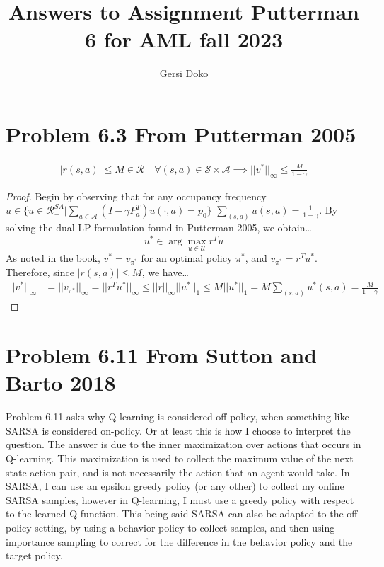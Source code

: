 \documentclass[11pt]{article}
\title{Answers to Assignment Putterman 6 for AML fall 2023}
\author{Gersi Doko}
\begin{document}
\maketitle

\section{Problem 6.3 From Putterman 2005}
\begin{align*}
	|r(s,a)| \leq M \in \mathcal{R} \quad \forall (s,a) \in \mathcal{S} \times \mathcal{A} \implies
	\lvert\lvert v^* \rvert\rvert_\infty \leq \frac{M}{1-\gamma}
\end{align*}

\begin{proof}
	Begin by observing that for any occupancy frequency
	$u \in \{u \in \mathcal{R}^{SA}_+ \vert \sum_{a\in\mathcal{A}}(I - \gamma P^T_a)u(\cdot, a) = p_0\}$
	$\sum_{(s,a)} u(s,a) = \frac{1}{1-\gamma}$. By solving the dual LP formulation found in Putterman 2005, we obtain\dots
	\[u^* \in \arg\max_{u \in \mathcal{U}} r^T u\]
	As noted in the book, $v^* = v_{\pi^*}$ for an optimal policy $\pi^*$, and $v_{\pi^*} = r^T u^*$. Therefore,
	since $|r(s,a)| \leq M$, we have\dots
	\begin{align*}
		\lvert\lvert v^* \rvert\rvert_\infty & = \lvert\lvert v_{\pi^*} \rvert\rvert_\infty = \lvert\lvert r^T u^* \rvert\rvert_\infty
		\leq \lvert\lvert r \rvert\rvert_\infty \lvert\lvert u^* \rvert\rvert_1 \leq M \lvert\lvert u^* \rvert\rvert_1
		= M \sum_{(s,a)} u^*(s,a) = \frac{M}{1-\gamma}
	\end{align*}
\end{proof}

\section{Problem 6.11 From Sutton and Barto 2018}
Problem 6.11 asks why Q-learning is considered off-policy, when something like SARSA is considered on-policy. Or at least this is how
I choose to interpret the question. The answer is due to the inner maximization over actions that occurs in Q-learning. This maximization
is used to collect the maximum value of the next state-action pair, and is not necessarily the action that an agent would take. In SARSA,
I can use an epsilon greedy policy (or any other) to collect my online SARSA samples, however in Q-learning, I must use a greedy policy with
respect to the learned Q function. This being said SARSA can also be adapted to the off policy setting, by using a behavior policy to collect
samples, and then using importance sampling to correct for the difference in the behavior policy and the target policy.
\end{document}
